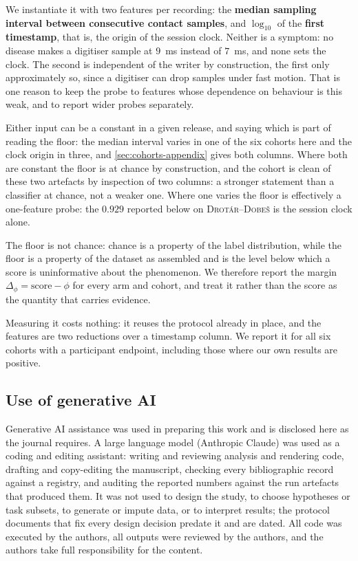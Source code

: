 \documentclass[10pt,a4paper]{article}
\begin{document}
We instantiate it with two features per recording: the \textbf{median sampling interval between
consecutive contact samples}, and $\log_{10}$ of the \textbf{first timestamp}, that is, the origin
of the session clock. Neither is a symptom: no disease makes a digitiser sample at $9$~ms instead
of $7$~ms, and none sets the clock. The second is independent of the writer by construction, the
first only approximately so, since a digitiser can drop samples under fast motion. That is one
reason to keep the probe to features whose dependence on behaviour is this weak, and to report wider
probes separately.

Either input can be a constant in a given release, and saying which is part of reading the floor:
the median interval varies in one of the six cohorts here and the clock origin in three, and
\cref{sec:cohorts-appendix} gives both columns. Where
both are constant the floor is at chance by construction, and the cohort is clean of these two
artefacts by inspection of two columns: a stronger statement than a classifier at chance, not a
weaker one. Where one varies the floor is effectively a one-feature probe: the $0.929$ reported
below on \textsc{Drot\'ar--Dobe\v{s}} is the session clock alone.

The floor is not chance: chance is a property of the label distribution, while the floor is a
property of the dataset as assembled and is the level below which a score is uninformative about the
phenomenon. We therefore report the margin $\Delta_\phi = \text{score} - \phi$ for every arm and
cohort, and treat it rather than the score as the quantity that carries evidence.

Measuring it costs nothing: it reuses the protocol already in place, and the features are two
reductions over a timestamp column. We report it for all six cohorts with a participant endpoint,
including those where our own results are positive.

\subsection{Use of generative AI}
\label{sec:genai}

Generative AI assistance was used in preparing this work and is disclosed here as the journal
requires. A large language model (Anthropic Claude) was used as a coding and editing assistant:
writing and reviewing analysis and rendering code, drafting and copy-editing the manuscript,
checking every bibliographic record against a registry, and auditing the reported numbers against
the run artefacts that produced them. It was not used to design the study, to choose hypotheses or
task subsets, to generate or impute data, or to interpret results; the protocol documents that fix
every design decision predate it and are dated. All code was executed by the authors, all outputs
were reviewed by the authors, and the authors take full responsibility for the content.
\end{document}
